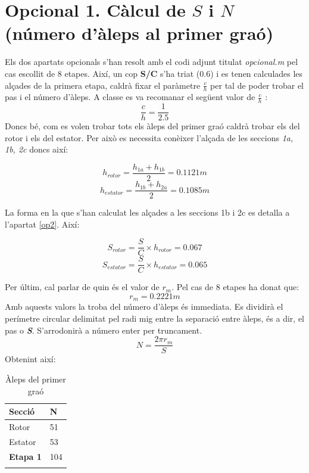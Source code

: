 \section{Opcional 1. Càlcul de $S$ i $N$ (número d'àleps al primer graó)}
\label{op1}
Els dos apartats opcionals s'han resolt amb el codi adjunt titulat \textit{opcional.m} pel cas escollit de 8 etapes. Així, un cop \textbf{S/C} s'ha triat (0.6) i es tenen calculades les alçades de la primera etapa, caldrà fixar el paràmetre $\frac{c}{h}$ per tal de poder trobar el pas i el número d'àleps. A classe es va recomanar el següent valor de $\frac{c}{h}$ :
\begin{equation}
\frac{c}{h} = \frac{1}{2.5}
\end{equation}
Doncs bé, com es volen trobar tots els àleps del primer graó caldrà trobar els del rotor i els del estator. Per això es necessita conèixer l'alçada de les seccions \textit{1a, 1b, 2c} doncs així:
\begin{multicols}{2}
  \begin{equation}
    h_{rotor} = \frac{h_{1a}+h_{1b}}{2} = 0.1121m
  \end{equation}\break
  \begin{equation}
    h_{estator} = \frac{h_{1b}+h_{2a}}{2} = 0.1085m
  \end{equation}
\end{multicols}
La forma en la que s'han calculat les alçades a les seccions 1b i 2c es detalla a l'apartat \ref{op2}.
Així:
\begin{multicols}{2}
  \begin{equation}
    S_{rotor} = \frac{S}{C}\times h_{rotor} = 0.067
  \end{equation}\break
  \begin{equation}
    S_{estator} = \frac{S}{C}\times h_{estator} = 0.065
  \end{equation}
\end{multicols}
Per últim, cal parlar de quin és el valor de $r_m$. Pel cas de 8 etapes ha donat que:
\begin{equation}
r_m = 0.2221m
\end{equation}
Amb aquests valors la troba  del número d'àleps és immediata. Es dividirà el perímetre circular delimitat pel radi mig entre la separació entre àleps, és a dir, el pas o \textbf{\textit{S}}. S'arrodonirà a número enter per truncament.
\begin{equation}
N = \frac{2\pi r_m}{S}
\end{equation}
Obtenint així:
\begin{longtable}[H]{C{2.5cm} C{2.5cm}}
	\toprule[2pt]
	\textbf{Secció} &  \textbf{N} \\ \bottomrule[2pt]
	Rotor & 51\\ \midrule
	Estator & 53\\ \midrule
	\textbf{Etapa 1} & 104\\
	\bottomrule[2pt]
	\caption{Àleps del primer graó}
	\label{aleps}
\end{longtable}

